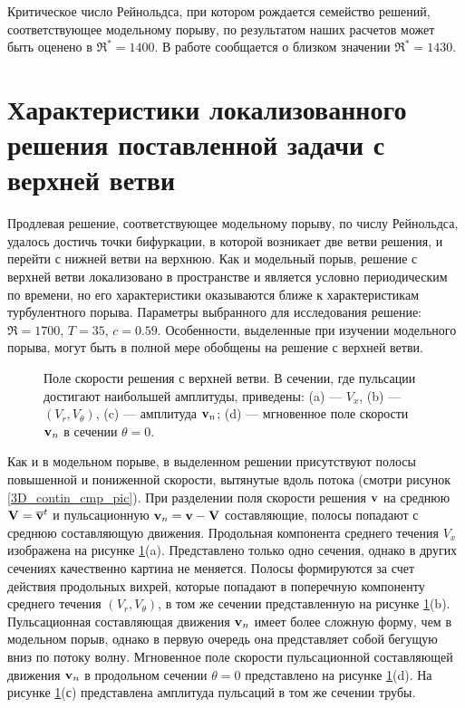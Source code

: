 Критическое число Рейнольдса, при котором рождается семейство решений, соответствующее модельному порыву, по результатом наших расчетов может быть оценено в $\Re^* = 1400$. В работе \cite{Avila2013} сообщается о близком значении $\Re^* = 1430$. 


\section{Характеристики локализованного решения поставленной задачи с верхней ветви}

Продлевая решение, соответствующее модельному порыву, по числу Рейнольдса, удалось достичь точки бифуркации, в которой возникает две ветви решения, и перейти с нижней ветви на верхнюю. Как и модельный порыв, решение с верхней ветви локализовано в пространстве и является условно периодическим по времени, но его характеристики оказываются ближе к характеристикам турбулентного порыва. Параметры выбранного для исследования решение: $\Re = 1700$, $T = 35$, $c = 0.59$. Особенности, выделенные при изучении модельного порыва, могут быть в полной мере обобщены на решение с верхней ветви. 


\begin{figure}
\caption{Поле скорости решения с верхней ветви. В сечении, где пульсации достигают наибольшей амплитуды, приведены: (a) --- $V_{x}$, (b) --- $(V_{r}, V_{\theta})$, (c) --- амплитуда $\mathbf{v}_n$; (d) --- мгновенное поле скорости $\mathbf{v}_n$ в сечении $\theta = 0$. }
\label{local_ub_means_pic}
\end{figure}


Как и в модельном порыве, в выделенном решении присутствуют полосы повышенной и пониженной скорости, вытянутые вдоль потока (смотри рисунок \ref{3D_contin_cmp_pic}). При разделении поля скорости решения $\mathbf{v}$ на среднюю $\mathbf{V} = \overline{\mathbf{v}}^t$ и пульсационную $\mathbf{v}_n = \mathbf{v} - \mathbf{V}$ составляющие, полосы попадают с среднюю составляющую движения. Продольная компонента среднего течения $V_x$ изображена на рисунке \ref{local_ub_means_pic}(a). Представлено только одно сечения, однако в других сечениях качественно картина не меняется. Полосы формируются за счет действия продольных вихрей, которые попадают в поперечную компоненту среднего течения $(V_r, V_\theta)$, в том же сечении представленную на рисунке \ref{local_ub_means_pic}(b). Пульсационная составляющая движения $\mathbf{v}_n$ имеет более сложную форму, чем в модельном порыв, однако в первую очередь она представляет собой бегущую вниз по потоку волну. Мгновенное поле скорости пульсационной составляющей движения $\mathbf{v}_n$ в продольном сечении $\theta = 0$ представлено на рисунке \ref{local_ub_means_pic}(d). На рисунке \ref{local_ub_means_pic}(с) представлена амплитуда пульсаций в том же сечении трубы. 


